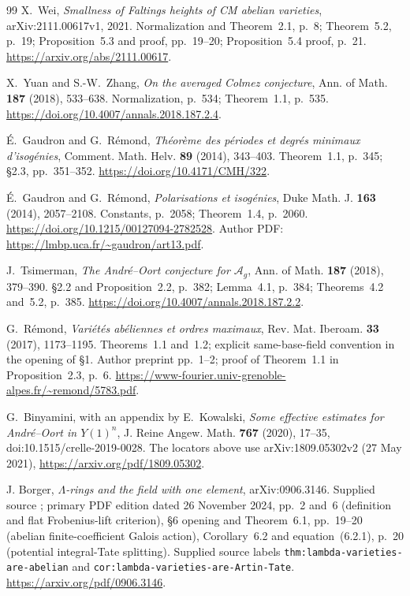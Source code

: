 \documentclass[11pt]{article}
\theoremstyle{remark}
\begin{document}
\begin{thebibliography}{99}
X.~Wei, \emph{Smallness of Faltings heights of CM abelian varieties},
arXiv:2111.00617v1, 2021. Normalization and Theorem~2.1, p.~8;
Theorem~5.2, p.~19; Proposition~5.3 and proof, pp.~19--20;
Proposition~5.4 proof, p.~21.
\url{https://arxiv.org/abs/2111.00617}.

X.~Yuan and S.-W.~Zhang, \emph{On the averaged Colmez conjecture},
Ann. of Math. \textbf{187} (2018), 533--638.
Normalization, p.~534; Theorem~1.1, p.~535.
\url{https://doi.org/10.4007/annals.2018.187.2.4}.

\'E.~Gaudron and G.~R\'emond, \emph{Th\'eor\`eme des p\'eriodes et
degr\'es minimaux d'isog\'enies}, Comment. Math. Helv. \textbf{89}
(2014), 343--403. Theorem~1.1, p.~345; \S2.3, pp.~351--352.
\url{https://doi.org/10.4171/CMH/322}.

\'E.~Gaudron and G.~R\'emond, \emph{Polarisations et isog\'enies},
Duke Math. J. \textbf{163} (2014), 2057--2108.
Constants, p.~2058; Theorem~1.4, p.~2060.
\url{https://doi.org/10.1215/00127094-2782528}.
Author PDF: \url{https://lmbp.uca.fr/~gaudron/art13.pdf}.

J.~Tsimerman, \emph{The Andr\'e--Oort conjecture for $\mathcal A_g$},
Ann. of Math. \textbf{187} (2018), 379--390.
\S2.2 and Proposition~2.2, p.~382; Lemma~4.1, p.~384;
Theorems~4.2 and~5.2, p.~385.
\url{https://doi.org/10.4007/annals.2018.187.2.2}.

G.~R\'emond, \emph{Vari\'et\'es ab\'eliennes et ordres maximaux},
Rev. Mat. Iberoam. \textbf{33} (2017), 1173--1195.
Theorems~1.1 and~1.2; explicit same-base-field convention in the
opening of \S1.  Author preprint pp.~1--2; proof of Theorem~1.1
in Proposition~2.3, p.~6.
\url{https://www-fourier.univ-grenoble-alpes.fr/~remond/5783.pdf}.

G.~Binyamini, with an appendix by E.~Kowalski,
\emph{Some effective estimates for Andr\'e--Oort in $Y(1)^n$},
J. Reine Angew. Math. \textbf{767} (2020), 17--35,
doi:10.1515/crelle-2019-0028.
The locators above use arXiv:1809.05302v2 (27 May 2021),
\url{https://arxiv.org/pdf/1809.05302}.


 J. Borger, \emph{$\Lambda$-rings and the field with one element},
arXiv:0906.3146. Supplied source
;
primary PDF edition dated 26 November 2024, pp.~2 and~6 (definition and flat
Frobenius-lift criterion), \S6 opening and Theorem~6.1, pp.~19--20
(abelian finite-coefficient Galois action), Corollary~6.2 and equation~(6.2.1),
p.~20 (potential integral-Tate splitting). Supplied source labels
\texttt{thm:lambda-varieties-are-abelian} and
\texttt{cor:lambda-varieties-are-Artin-Tate}.
\url{https://arxiv.org/pdf/0906.3146}.


\end{thebibliography}
\end{document}
